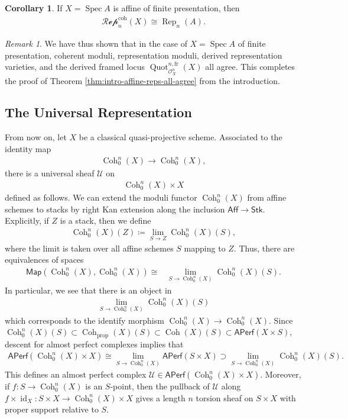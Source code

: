 \documentclass{article}
\numberwithin{equation}{section}
\theoremstyle{quest}
\theoremstyle{definition}
\newtheorem{cor}[thm]{Corollary}
\theoremstyle{remark}
\newtheorem{rmk}[thm]{Remark}
\DeclareMathOperator{\Spec}{Spec}
\DeclareMathOperator{\id}{id}
\DeclareMathOperator{\Rep}{Rep}
\DeclareMathOperator{\Coh}{Coh}
\DeclareMathOperator{\Quot}{Quot}
\begin{document}
 

 \begin{cor}\label{cor:coherent-reps-match-reps}
	If $X=\Spec A$ is affine of finite presentation, then
	\begin{align*}
		\mathscr{Rep}_n^{\text{coh}}(X)\cong\Rep_n(A).
	\end{align*} 
\end{cor} 

\begin{rmk}
	We have thus shown that in the case of $X=\Spec A$ of finite presentation, coherent moduli, representation moduli, derived representation varieties, and the derived framed locus $\Quot ^{n,\text{fr}}_{\mathscr{O}_X^n}(X)$ all agree. This completes the proof of Theorem \ref{thm:intro-affine-reps-all-agree} from the introduction.
\end{rmk} 

\subsection{The Universal Representation}\label{sec:universal-sheaves}
From now on, let $X$ be a classical quasi-projective scheme. Associated to the identity map
\begin{align*}
	\Coh^n_0(X)\to \Coh^n_0(X),
\end{align*} 
there is a universal sheaf $\mathscr{U}$ on
\begin{align*}
	\Coh^n_0(X)\times X
\end{align*} 
defined as follows. We can extend the moduli functor $\Coh^n_0(X)$ from affine schemes to stacks by right Kan extension along the inclusion $\mathsf{Aff}\to \mathsf{Stk}$. Explicitly, if $ Z$ is a stack, then we define
\begin{align*}
	\Coh^n_0(X)(Z)\coloneqq \lim_{S\to Z}\Coh^n_0(X)(S),
\end{align*} 
where the limit is taken over all affine schemes $S$ mapping to $Z$. Thus, there are equivalences of spaces
\begin{align*}
	\mathsf{Map}(\Coh^n_0(X),\Coh^n_0(X))\cong&\lim_{S\to \Coh^n_0(X)}\Coh^n_0(X)(S).
\end{align*} 
In particular, we see that there is an object in
\begin{align*}
	\lim_{S\to \Coh^n_0(X)}\Coh^n_0(X)(S)
\end{align*} 
which corresponds to the identify morphism $\Coh^n_0(X)\to \Coh^n_0(X)$. Since $\Coh^n_0(X)(S)\subset \Coh_{\text{prop}}(X)(S)\subset \Coh(X)(S)\subset \mathsf{APerf}(X\times S)$, descent for almost perfect complexes implies that
\begin{align*}
	\mathsf{APerf}(\Coh^n_0(X) \times X)\cong \lim_{S\to \Coh^n_0(X)}\mathsf{APerf}(S\times X)\supset \lim_{S\to \Coh^n_0(X)}\Coh^n_0(X)(S).
\end{align*} 
This defines an almost perfect complex $\mathscr{U}\in \mathsf{APerf}(\Coh^n_0(X)\times X)$. Moreover, if $f:S\to \Coh^n_0(X)$ is an $S$-point, then the pullback of $\mathscr{U}$ along $f\times \id_X:S\times X\to \Coh^n_0(X)\times X$ gives a length $n$ torsion sheaf on $S\times X$ with proper support relative to $S$.
\end{document}
